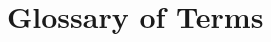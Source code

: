 \documentclass[12pt]{book}
\begin{document}
%

%

%

\chapter{Glossary of Terms}
\label{app:glossary}


\newpage
\begin{thebibliography}{MM99m}



\end{thebibliography}
\end{document}
